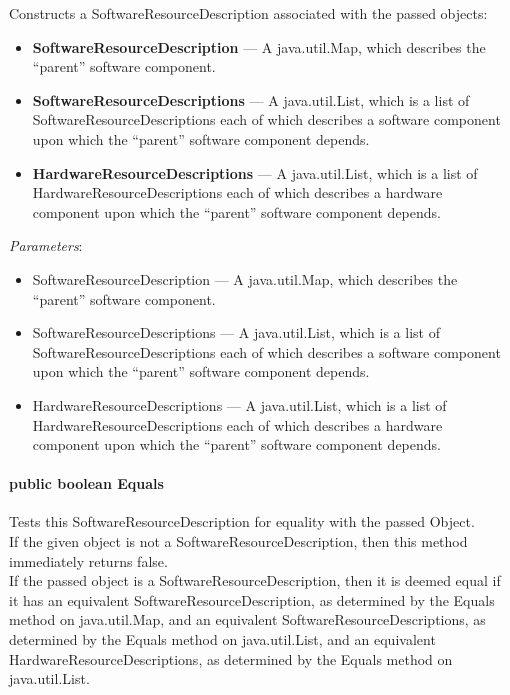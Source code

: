 \documentclass[$Date: 2003/06/26 19:29:31 $]{glabarticle}
\begin{document}
Constructs a SoftwareResourceDescription associated with the passed objects:
\begin{itemize}
  \item \textbf{SoftwareResourceDescription} --- A java.util.Map, which describes the ``parent'' software
  component.
  \item \textbf{SoftwareResourceDescriptions} --- A java.util.List, which is a list of SoftwareResourceDescriptions
  each of which describes a software component upon which the ``parent'' software component depends.
  \item \textbf{HardwareResourceDescriptions} --- A java.util.List, which is a list of HardwareResourceDescriptions
  each of which describes a hardware component upon which the ``parent'' software component depends.\\
\end{itemize}

\textit{Parameters}:
\begin{itemize}
\item[] SoftwareResourceDescription --- A java.util.Map, which describes the ``parent'' software component.
\item[] SoftwareResourceDescriptions --- A java.util.List, which is a list of SoftwareResourceDescriptions each of which
 describes a software component upon which the ``parent'' software component depends.
 \item[] HardwareResourceDescriptions --- A java.util.List, which is a list of HardwareResourceDescriptions
  each of which describes a hardware component upon which the ``parent'' software component depends.\\
\end{itemize}

\paragraph{public boolean Equals}

Tests this SoftwareResourceDescription for equality with the passed
Object. \\

 If the given object is not a SoftwareResourceDescription, then this
 method immediately returns false. \\
 
 If the passed object is a SoftwareResourceDescription, then it is
 deemed equal if it has an equivalent SoftwareResourceDescription, as
 determined by the Equals method on java.util.Map, and an equivalent
 SoftwareResourceDescriptions, as determined by the Equals method on
 java.util.List, and an equivalent HardwareResourceDescriptions, as determined
 by the Equals method on java.util.List. \\
 
\end{document}
